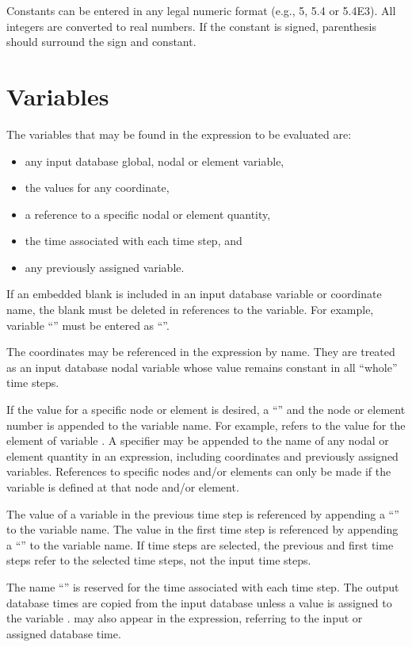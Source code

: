Constants can be entered in any legal  numeric format
(e.g., 5, 5.4 or 5.4E3). All integers are converted to real numbers. If
the constant is signed, parenthesis should surround the sign and
constant.

\section{Variables}

The variables that may be found in the expression to be evaluated are:
\setlength{\itemsep}{\smallskipamount} \begin{itemize}
\item any input database global, nodal or element variable,
\item the values for any coordinate,
\item a reference to a specific nodal or element quantity,
\item the time associated with each time step, and
\item any previously assigned variable.
\end{itemize}

If an embedded blank is included in an input database variable or
coordinate name, the blank must be deleted in references to the
variable. For example, variable ``'' must be entered as
``''.

The coordinates may be referenced in the expression by name. They are
treated as an input database nodal variable whose value remains constant
in all ``whole'' time steps.

If the value for a specific node or element is desired, a ``\cmd{\$}''
and the node or element number is appended to the variable name. For
example,  refers to the value for the  element
of variable . A specifier may be appended to the name of any
nodal or element quantity in an expression, including coordinates and
previously assigned variables. References to specific nodes and/or
elements can only be made if the variable is defined at that node and/or
element.

The value of a variable in the previous time step is referenced by
appending a ``\cmd{:}'' to the variable name. The value in the first
time step is referenced by appending a ``'' to the variable
name. If time steps are selected, the previous and first time steps
refer to the selected time steps, not the input time steps.

The name ``'' is reserved for the time associated with each
time step. The output database times are copied from the input database
unless a value is assigned to the variable .  may also
appear in the expression, referring to the input or assigned database
time.

